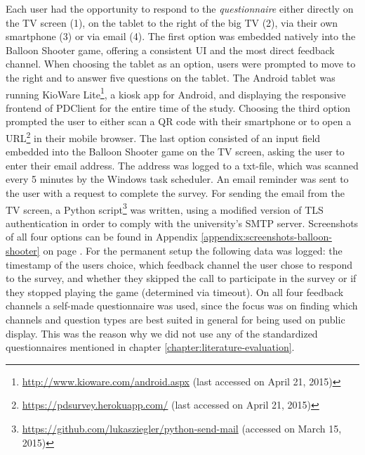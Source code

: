 		Each user had the opportunity to respond to the \textit{questionnaire} either directly on the TV screen (1), on the tablet to the right of the big TV (2), via their own smartphone (3) or via email (4). The first option was embedded natively into the Balloon Shooter game, offering a consistent UI and the most direct feedback channel. When choosing the tablet as an option, users were prompted to move to the right and to answer five questions on the tablet. The Android tablet was running KioWare Lite\footnote{\url{http://www.kioware.com/android.aspx} (last accessed on April 21, 2015)}, a kiosk app for Android, and displaying the responsive frontend of PDClient for the entire time of the study. Choosing the third option prompted the user to either scan a QR code with their smartphone or to open a URL\footnote{\url{https://pdsurvey.herokuapp.com/} (last accessed on April 21, 2015)} in their mobile browser. The last option consisted of an input field embedded into the Balloon Shooter game on the TV screen, asking the user to enter their email address. The address was logged to a txt-file, which was scanned every 5 minutes by the Windows task scheduler. An email reminder was sent to the user with a request to complete the survey. For sending the email from the TV screen, a Python script\footnote{\url{https://github.com/lukasziegler/python-send-mail} (accessed on March 15, 2015)} was written, using a modified version of TLS authentication in order to comply with the university's SMTP server. Screenshots of all four options can be found in Appendix \ref{appendix:screenshots-balloon-shooter} on page \pageref{appendix:screenshots-balloon-shooter}.
		For the permanent setup the following data was logged: the timestamp of the users choice, which feedback channel the user chose to respond to the survey, and whether they skipped the call to participate in the survey or if they stopped playing the game (determined via timeout). 
		On all four feedback channels a self-made questionnaire was used, since the focus was on finding which channels and question types are best suited in general for being used on public display. This was the reason why we did not use any of the standardized questionnaires mentioned in chapter \ref{chapter:literature-evaluation}. 


